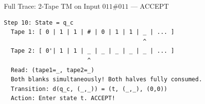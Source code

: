 \begin{examplebox}{{Full Trace: 2-Tape TM on Input $011\#011$ --- ACCEPT}}
\begin{lstlisting}
Step 10: State = q_c
  Tape 1: [ 0 | 1 | 1 | # | 0 | 1 | 1 | _ | ... ]
                                        ^
  Tape 2: [ 0'| 1 | 1 | _ | _ | _ | _ | _ | ... ]
                        ^
  Read: (tape1=_, tape2=_)
  Both blanks simultaneously! Both halves fully consumed.
  Transition: d(q_c, (_,_)) = (t, (_,_), (0,0))
  Action: Enter state t. ACCEPT!
\end{lstlisting}

\end{examplebox}

\bigskip

